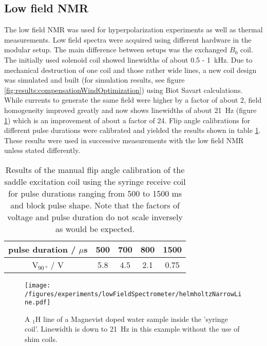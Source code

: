     \subsection{Low field NMR}
    \label{chap:results:lowFieldNMR}
    The low field NMR was used for hyperpolarization experiments as well as thermal measurements. Low field spectra were acquired using different hardware in the modular setup. The main difference between setups was the exchanged $B_0$ coil. The initially used solenoid coil showed linewidths of about 0.5 - \SI{1}{\kilo\hertz}. Due to mechanical destruction of one coil and those rather wide lines, a new coil design was simulated and built (for simulation results, see figure \ref{fig:results:compensationWindOptimization}) using Biot Savart calculations. While currents to generate the same field were higher by a factor of about 2, field homogeneity improved greatly and now shows linewidths of about \SI{21}{\hertz} (figure \ref{results:lowFieldSpectrometer:thinLine}) which is an improvement of about a factor of 24. Flip angle calibrations for different pulse durations were calibrated and yielded the results shown in table \ref{table:results:FA}. These results were used in successive measurements with the low field NMR unless stated differently.
        \begin{table}
            \centering
            \begin{tabular}{|c|cccc|}
            \hline
            pulse duration / $\mu$s & 500 & 700 &  800 & 1500 \\
            \hline
            $\mathrm{V}_{\SI{90}{\degree}}$ / V & 5.8 & 4.5 &  2.1&  0.75 \\
            \hline
            \end{tabular} 
            \caption[Flip angle calibration results]{Results of the manual flip angle calibration of the saddle excitation coil using the syringe receive coil for pulse durations ranging from 500 to 1500 ms and block pulse shape. Note that the factors of voltage and pulse duration do not scale inversely as would be expected.}
            \label{table:results:FA}
        \end{table}
            \begin{figure}
                \centering
                \texttt{[image: /figures/experiments/lowFieldSpectrometer/helmholtzNarrowLine.pdf]}
                \caption[Thin line helmholtz coils]{A $_1\mathrm{H}$ line of a Magnevist doped water sample inside the 'syringe coil'. Linewidth is down to \SI{21}{\hertz} in this example without the use of shim coils.}
                \label{results:lowFieldSpectrometer:thinLine}
            \end{figure}
